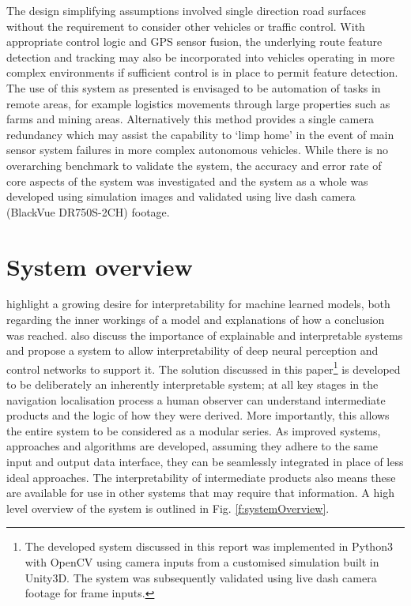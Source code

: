 \documentclass[]{aiaa-tc}%
\begin{document}
The design simplifying assumptions involved single direction road surfaces without the requirement to consider other vehicles or traffic control. With appropriate control logic and GPS sensor fusion, the underlying route feature detection and tracking may also be incorporated into vehicles operating in more complex environments if sufficient control is in place to permit feature detection. The use of this system as presented is envisaged to be automation of tasks in remote areas, for example logistics movements through large properties such as farms and mining areas. Alternatively this method provides a single camera redundancy which may assist the capability to `limp home' in the event of main sensor system failures in more complex autonomous vehicles. While there is no overarching benchmark to validate the system, the accuracy and error rate of core aspects of the system was investigated and the system as a whole was developed using simulation images and validated using live dash camera (BlackVue DR750S-2CH) footage.


\section{System overview}
\citet{explainableAIStakeholders} highlight a growing desire for interpretability for machine learned models, both regarding the inner workings of a model and explanations of how a conclusion was reached. \citet{explainableCNNBookChapter} also discuss the importance of explainable and interpretable systems and propose a system to allow interpretability of deep neural perception and control networks to support it. The solution discussed in this paper\footnote{The developed system discussed in this report was implemented in Python3 with OpenCV using camera inputs from a customised simulation built in Unity3D. The system was subsequently validated using live dash camera footage for frame inputs.} is developed to be deliberately an inherently interpretable system; at all key stages in the navigation localisation process a human observer can understand intermediate products and the logic of how they were derived.  More importantly, this allows the entire system to be considered as a modular series. As improved systems, approaches and algorithms are developed, assuming they adhere to the same input and output data interface, they can be seamlessly integrated in place of less ideal approaches. The interpretability of intermediate products also means these are available for use in other systems that may require that information. A high level overview of the system is outlined in Fig. \ref{f:systemOverview}.
\end{document}
